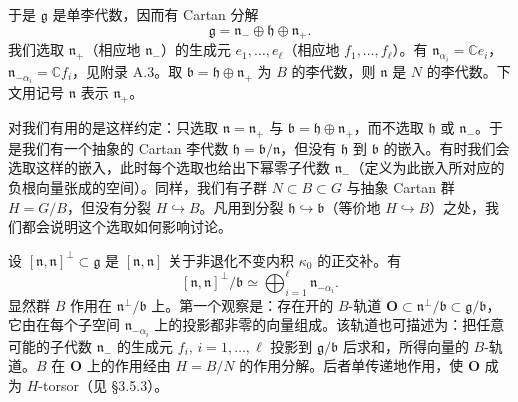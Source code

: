 于是 $\mathfrak{g}$ 是单李代数，因而有 Cartan 分解
\[
    \mathfrak{g}=\mathfrak{n}_-\oplus\mathfrak{h}\oplus\mathfrak{n}_+.
\]
我们选取 $\mathfrak{n}_+$（相应地 $\mathfrak{n}_-$）的生成元 $e_1,\dots,e_\ell$（相应地 $f_1,\dots,f_\ell$）。有 $\mathfrak{n}_{\alpha_i}=\mathbb{C}e_i$，$\mathfrak{n}_{-\alpha_i}=\mathbb{C}f_i$，见附录 A.3。取 $\mathfrak{b}=\mathfrak{h}\oplus\mathfrak{n}_+$ 为 $B$ 的李代数，则 $\mathfrak{n}$ 是 $N$ 的李代数。下文用记号 $\mathfrak{n}$ 表示 $\mathfrak{n}_+$。

对我们有用的是这样约定：只选取 $\mathfrak{n}=\mathfrak{n}_+$ 与 $\mathfrak{b}=\mathfrak{h}\oplus\mathfrak{n}_+$，而不选取 $\mathfrak{h}$ 或 $\mathfrak{n}_-$。于是我们有一个抽象的 Cartan 李代数 $\mathfrak{h}=\mathfrak{b}/\mathfrak{n}$，但没有 $\mathfrak{h}$ 到 $\mathfrak{b}$ 的嵌入。有时我们会选取这样的嵌入，此时每个选取也给出下幂零子代数 $\mathfrak{n}_-$（定义为此嵌入所对应的负根向量张成的空间）。同样，我们有子群 $N\subset B\subset G$ 与抽象 Cartan 群 $H=G/B$，但没有分裂 $H\hookrightarrow B$。凡用到分裂 $\mathfrak{h}\hookrightarrow\mathfrak{b}$（等价地 $H\hookrightarrow B$）之处，我们都会说明这个选取如何影响讨论。

设 $[\mathfrak{n},\mathfrak{n}]^\perp\subset\mathfrak{g}$ 是 $[\mathfrak{n},\mathfrak{n}]$ 关于非退化不变内积 $\kappa_0$ 的正交补。有
\[
    [\mathfrak{n},\mathfrak{n}]^\perp/\mathfrak{b}\simeq\bigoplus_{i=1}^{\ell}\mathfrak{n}_{-\alpha_i}.
\]
显然群 $B$ 作用在 $\mathfrak{n}^\perp/\mathfrak{b}$ 上。第一个观察是：存在开的 $B$-轨道 $\mathbf{O}\subset\mathfrak{n}^\perp/\mathfrak{b}\subset\mathfrak{g}/\mathfrak{b}$，它由在每个子空间 $\mathfrak{n}_{-\alpha_i}$ 上的投影都非零的向量组成。该轨道也可描述为：把任意可能的子代数 $\mathfrak{n}_-$ 的生成元 $f_i,\,i=1,\dots,\ell$ 投影到 $\mathfrak{g}/\mathfrak{b}$ 后求和，所得向量的 $B$-轨道。$B$ 在 $\mathbf{O}$ 上的作用经由 $H=B/N$ 的作用分解。后者单传递地作用，使 $\mathbf{O}$ 成为 $H$-torsor（见 §3.5.3）。


